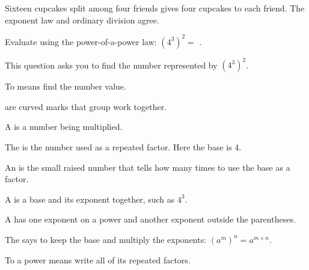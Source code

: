 
Sixteen cupcakes split among four friends gives four cupcakes to each friend.
The exponent law and ordinary division agree.


Evaluate using the power-of-a-power law: $(4^{3})^{2} = $ \blank[1.8cm].


This question asks you to find the number represented by $(4^{3})^{2}$.

\begin{words}
  \item To means find the number value.
  \item {}are curved marks that group work together.
  \item A is a number being multiplied.
  \item The is the number used as a repeated factor. Here the base
    is 4.
  \item An is the small raised number that tells how many times to
    use the base as a factor.
  \item A is a base and its exponent together, such as $4^{3}$.
  \item A has one exponent on a power and another exponent
    outside the parentheses.
  \item The says to keep the base and multiply the
    exponents: $(a^{m})^{n} = a^{m \times n}$.
  \item To a power means write all of its repeated factors.
\end{words}

